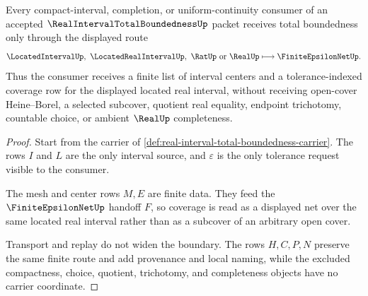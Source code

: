 \begin{theorem}
\label{thm:real-interval-total-boundedness-finite-net-handoff}
Every compact-interval, completion, or uniform-continuity consumer of an accepted $\RealIntervalTotalBoundednessUp$ packet receives total boundedness only through the displayed route
$$
\LocatedIntervalUp,\ \LocatedRealIntervalUp,\ \RatUp\ \text{or}\ \RealUp
\longmapsto
\FiniteEpsilonNetUp .
$$
Thus the consumer receives a finite list of interval centers and a tolerance-indexed coverage row for the displayed located real interval, without receiving open-cover Heine--Borel, a selected subcover, quotient real equality, endpoint trichotomy, countable choice, or ambient $\RealUp$ completeness.
\end{theorem}
\begin{proof}
Start from the carrier of \autoref{def:real-interval-total-boundedness-carrier}. The rows $I$ and $L$ are the only interval source, and $\varepsilon$ is the only tolerance request visible to the consumer.

The mesh and center rows $M,E$ are finite data. They feed the $\FiniteEpsilonNetUp$ handoff $F$, so coverage is read as a displayed net over the same located real interval rather than as a subcover of an arbitrary open cover.

Transport and replay do not widen the boundary. The rows $H,C,P,N$ preserve the same finite route and add provenance and local naming, while the excluded compactness, choice, quotient, trichotomy, and completeness objects have no carrier coordinate.
\end{proof}

